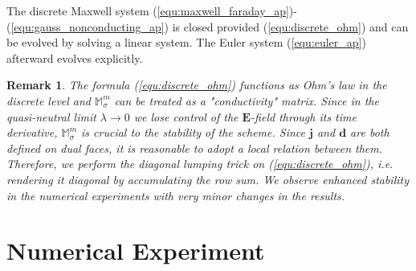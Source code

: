 \documentclass{article}
\newtheorem*{remark}{Remark}
\begin{document}
The discrete Maxwell system (\ref{equ:maxwell_faraday_ap})-(\ref{equ:gauss_nonconducting_ap}) is closed provided (\ref{equ:discrete_ohm}) and can be evolved by solving a linear system. The Euler system (\ref{equ:euler_ap}) afterward evolves explicitly. 

\begin{remark}
    The formula (\ref{equ:discrete_ohm}) functions as Ohm's law in the discrete level and $\mathbb{M}_\sigma^m$ can be treated as a "conductivity" matrix. Since in the quasi-neutral limit $\lambda \rightarrow 0$ we lose control of the $\mathbf{E}$-field through its time derivative, $\mathbb{M}_\sigma^m$ is crucial to the stability of the scheme. Since $\mathbf{j}$ and $\mathbf{d}$ are both defined on dual faces, it is reasonable to adopt a local relation between them. Therefore, we perform the \emph{diagonal lumping} trick on (\ref{equ:discrete_ohm}), i.e. rendering it diagonal by accumulating the row sum. We observe enhanced stability in the numerical experiments with very minor changes in the results.
\end{remark}
\section{Numerical Experiment}
\end{document}
